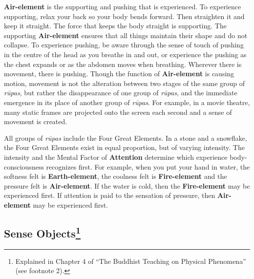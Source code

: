 \textbf{Air-element} is the supporting and pushing that is experienced. To experience supporting, relax your back so your body bends forward. Then straighten it and keep it straight. The force that keeps the body straight is supporting. The supporting \textbf{Air-element} ensures that all things maintain their shape and do not collapse. To experience pushing, be aware through the sense of touch of pushing in the centre of the head as you breathe in and out, or experience the pushing as the chest expands or as the abdomen moves when breathing. Wherever there is movement, there is pushing. Though the function of \textbf{Air-element} is causing motion, movement is not the alteration between two stages of the same group of \textit{rūpas}, but rather the disappearance of one group of \textit{rūpas}, and the immediate emergence in its place of another group of \textit{rūpas}. For example, in a movie theatre, many static frames are projected onto the screen each second and a sense of movement is created.

All groups of \textit{rūpas} include the Four Great Elements. In a stone and a snowflake, the Four Great Elements exist in equal proportion, but of varying intensity. The intensity and the Mental Factor of \textbf{Attention} determine which experience body-consciousness recognizes first. For example, when you put your hand in water, the softness felt is \textbf{Earth-element}, the coolness felt is \textbf{Fire-element} and the pressure felt is \textbf{Air-element}. If the water is cold, then the \textbf{Fire-element} may be experienced first. If attention is paid to the sensation of pressure, then \textbf{Air-element} may be experienced first.

\subsection*{Sense Objects\footnote{Explained in Chapter 4 of “The Buddhist Teaching on Physical Phenomena” (see footnote 2).}}

